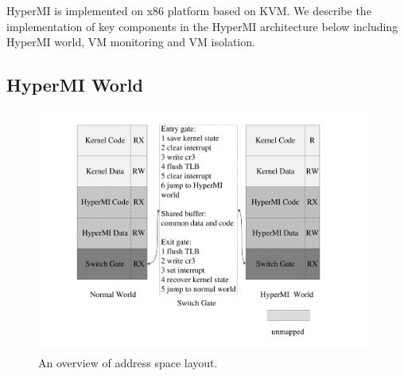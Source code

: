 \documentclass[conference]{IEEEtran}
\begin{document}
HyperMI is implemented on x86 platform based on KVM.
We describe the implementation of key components in the HyperMI architecture below including HyperMI world, VM monitoring and VM isolation.

\subsection{HyperMI World} \label {HWorld}

\begin{figure}
\centerline{\includegraphics[width=11cm, height=8cm]{pdfvmcs2.pdf}}%
\caption{An overview of address space layout.} \label{fig2}
\end{figure}
\end{document}
